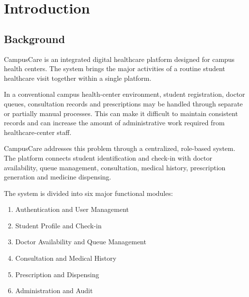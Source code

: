 \documentclass{tietreport}
\begin{document}

\tableofcontents

\clearpage



\chapter{Introduction}

\section{Background}

CampusCare is an integrated digital healthcare platform designed for
campus health centers. The system brings the major activities of a
routine student healthcare visit together within a single platform.

In a conventional campus health-center environment, student
registration, doctor queues, consultation records and prescriptions
may be handled through separate or partially manual processes. This
can make it difficult to maintain consistent records and can increase
the amount of administrative work required from healthcare-center
staff.

CampusCare addresses this problem through a centralized,
role-based system. The platform connects student identification and
check-in with doctor availability, queue management, consultation,
medical history, prescription generation and medicine dispensing.

The system is divided into six major functional modules:

\begin{enumerate}
    \item Authentication and User Management
    \item Student Profile and Check-in
    \item Doctor Availability and Queue Management
    \item Consultation and Medical History
    \item Prescription and Dispensing
    \item Administration and Audit
\end{enumerate}
\end{document}
